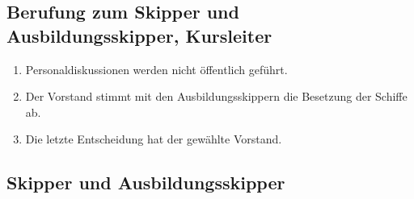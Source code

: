 \documentclass[10pt, twocolumn, parskip=half]{scrartcl}
\begin{document}
\subsection{Berufung zum Skipper und Ausbildungsskipper, Kursleiter}
\begin{enumerate}[noitemsep]
	\item Personaldiskussionen werden nicht öffentlich geführt.
	\item Der Vorstand stimmt mit den Ausbildungsskippern die Besetzung der Schiffe ab.
	\item Die letzte Entscheidung hat der gewählte Vorstand.
\end{enumerate}

\subsection{Skipper und Ausbildungsskipper}
\end{document}
